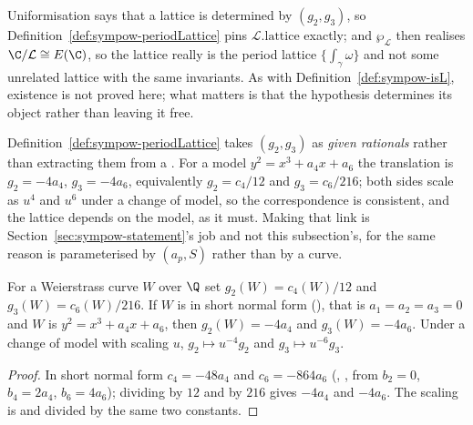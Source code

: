 \begin{remark}
  \label{rem:lattice-determined}
  Uniformisation says that a lattice is determined by $(g_{2},g_{3})$, so
  Definition~\ref{def:sympow-periodLattice} pins $\mathcal{L}.\mathrm{lattice}$ exactly; and
  $\wp_{\mathcal{L}}$ then realises $\C/\mathcal{L} \cong E(\C)$, so the lattice really is the
  period lattice $\{\int_{\gamma}\omega\}$ and not some unrelated lattice with the same
  invariants. As with Definition~\ref{def:sympow-isL}, existence is not proved here; what
  matters is that the hypothesis determines its object rather than leaving it free.

  Definition~\ref{def:sympow-periodLattice} takes $(g_{2},g_{3})$ as \emph{given rationals}
  rather than extracting them from a . For a model
  $y^{2}=x^{3}+a_{4}x+a_{6}$ the translation is $g_{2}=-4a_{4}$, $g_{3}=-4a_{6}$, equivalently
  $g_{2}=c_{4}/12$ and $g_{3}=c_{6}/216$; both sides scale as $u^{4}$ and $u^{6}$ under a
  change of model, so the correspondence is consistent, and the lattice depends on the model, as
  it must. Making that link is Section~\ref{sec:sympow-statement}'s job and not this
  subsection's, for the same reason  is parameterised by $(a_{p}, S)$ rather
  than by a curve.
\end{remark}

\begin{lemma}
  \label{lem:weierstrass-g}
  For a Weierstrass curve $W$ over $\Q$ set $g_{2}(W) = c_{4}(W)/12$ and
  $g_{3}(W) = c_{6}(W)/216$. If $W$ is in short normal form (),
  that is $a_{1}=a_{2}=a_{3}=0$ and $W$ is $y^{2}=x^{3}+a_{4}x+a_{6}$, then $g_{2}(W) = -4a_{4}$
  and $g_{3}(W) = -4a_{6}$. Under a change of model with scaling $u$,
  $g_{2} \mapsto u^{-4}g_{2}$ and $g_{3} \mapsto u^{-6}g_{3}$.
\end{lemma}
\begin{proof}
  In short normal form $c_{4}=-48a_{4}$ and $c_{6}=-864a_{6}$
  (, , from
  $b_{2}=0$, $b_{4}=2a_{4}$, $b_{6}=4a_{6}$); dividing by $12$ and by $216$ gives $-4a_{4}$ and
  $-4a_{6}$. The
  scaling is  and
   divided by the same two constants.
\end{proof}

